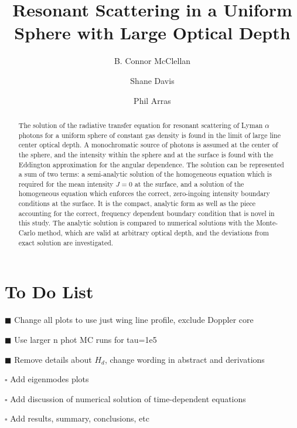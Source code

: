 \documentclass{aastex63}
\begin{document}
\title{Resonant Scattering in a Uniform Sphere with Large Optical Depth}




\author{B. Connor McClellan}
\author{Shane Davis}
\author{Phil Arras}


\begin{abstract}

The solution of the radiative transfer equation for resonant scattering of Lyman $\alpha$ photons for a uniform sphere of constant gas density is found in the limit of large line center optical depth. A monochromatic source of photons is assumed at the center of the sphere, and the intensity within the sphere and at the surface is found with the Eddington approximation for the angular dependence. The solution can be represented a sum of two terms: a semi-analytic solution of the homogeneous equation which is required for the mean intensity $J=0$ at the surface, and a solution of the homogeneous equation which enforces the correct, zero-ingoing intensity boundary conditions at the surface. It is the compact, analytic form as well as the piece accounting for the correct, frequency dependent boundary condition that is novel in this study. The analytic solution is compared to numerical solutions with the Monte-Carlo method, which are valid at arbitrary optical depth, and the deviations from exact solution are investigated.

\end{abstract}


\keywords{}

\section{To Do List}
$\blacksquare$ Change all plots to use just wing line profile, exclude Doppler core

$\blacksquare$ Use larger n phot MC runs for tau=1e5

$\blacksquare$ Remove details about $H_d$, change wording in abstract and derivations

$\square$ Add eigenmodes plots

$\square$ Add discussion of numerical solution of time-dependent equations

$\square$ Add results, summary, conclusions, etc
\end{document}

